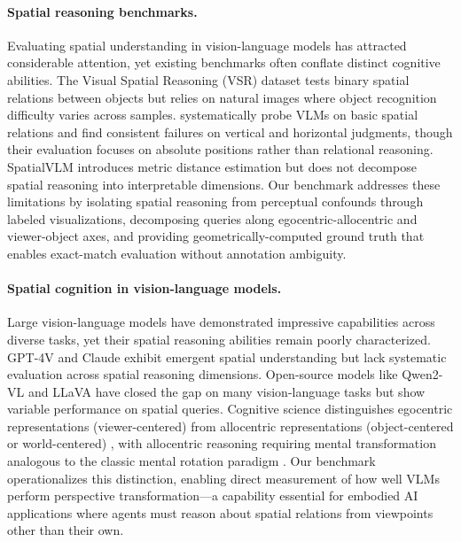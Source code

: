 
\paragraph{Spatial reasoning benchmarks.}
Evaluating spatial understanding in vision-language models has attracted considerable attention, yet existing benchmarks often conflate distinct cognitive abilities. The Visual Spatial Reasoning (VSR) dataset \cite{liu2023vsr} tests binary spatial relations between objects but relies on natural images where object recognition difficulty varies across samples. \citet{kamath2023whatsup} systematically probe VLMs on basic spatial relations and find consistent failures on vertical and horizontal judgments, though their evaluation focuses on absolute positions rather than relational reasoning. SpatialVLM \cite{chen2024spatialvlm} introduces metric distance estimation but does not decompose spatial reasoning into interpretable dimensions. Our benchmark addresses these limitations by isolating spatial reasoning from perceptual confounds through labeled visualizations, decomposing queries along egocentric-allocentric and viewer-object axes, and providing geometrically-computed ground truth that enables exact-match evaluation without annotation ambiguity.

\paragraph{Spatial cognition in vision-language models.}
Large vision-language models have demonstrated impressive capabilities across diverse tasks, yet their spatial reasoning abilities remain poorly characterized. GPT-4V \cite{openai2024gpt4} and Claude \cite{anthropic2024claude} exhibit emergent spatial understanding but lack systematic evaluation across spatial reasoning dimensions. Open-source models like Qwen2-VL \cite{wang2024qwen2vl} and LLaVA \cite{liu2024llava} have closed the gap on many vision-language tasks but show variable performance on spatial queries. Cognitive science distinguishes egocentric representations (viewer-centered) from allocentric representations (object-centered or world-centered) \cite{klatzky1998allocentric, burgess2006spatial}, with allocentric reasoning requiring mental transformation analogous to the classic mental rotation paradigm \cite{shepard1971mental}. Our benchmark operationalizes this distinction, enabling direct measurement of how well VLMs perform perspective transformation---a capability essential for embodied AI applications \cite{driess2023palme, brohan2023rt2} where agents must reason about spatial relations from viewpoints other than their own.

